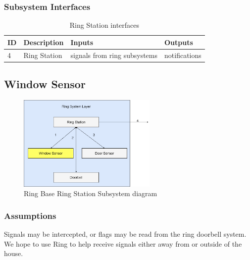 \subsubsection{Subsystem Interfaces}

\begin {table}[H]
\caption {Ring Station interfaces} 
\begin{center}
    \begin{tabular}{ | p{1cm} | p{6cm} | p{3cm} | p{3cm} |}
    \hline
    ID & Description & Inputs & Outputs \\ \hline
    4 & Ring Station & signals from ring subsystems & notifications  \\ \hline
    \end{tabular}
\end{center}
\end{table}
\newpage

\subsection{Window Sensor}

\begin{figure}[h!]
	\centering
 	\includegraphics[width=0.60\textwidth]{images/RingLayer.drawio2.png}
 \caption{Ring Base Ring Station Subsystem diagram}
\end{figure}

\subsubsection{Assumptions}
Signals may be intercepted, or flags may be read from the ring doorbell system. We hope to use Ring to help receive signals either away from or outside of the house.

